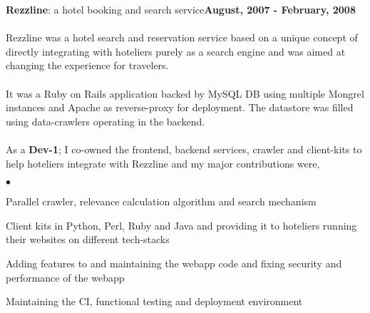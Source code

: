 \documentclass[margin,line]{res}
\newenvironment{list2}{
  \begin{list}{$\bullet$}{%
      \setlength{\itemsep}{0in}
      \setlength{\parsep}{0in} \setlength{\parskip}{0in}
      \setlength{\topsep}{0in} \setlength{\partopsep}{0in} 
      \setlength{\leftmargin}{0.2in}}}{\end{list}}
\begin{document}
\begin{resume}
{\bf Rezzline}: a hotel booking and search service\hfill {\bf August, 2007 - February, 2008}\\
\\
Rezzline was a hotel search and reservation service based on a unique concept of directly integrating with hoteliers purely as a search engine and was aimed at changing the experience for travelers.\\
\\
It was a Ruby on Rails application backed by MySQL DB using multiple Mongrel instances and Apache as reverse-proxy for deployment. The datastore was filled using data-crawlers operating in the backend.\\
\\
As a {\bf Dev-1}; I co-owned the frontend, backend services, crawler and client-kits to help hoteliers integrate with Rezzline and my major contributions were,\\
\begin{list2}
\item Parallel crawler, relevance calculation algorithm and search mechanism
\item Client kits in Python, Perl, Ruby and Java and providing it to hoteliers running their websites on different tech-stacks
\item Adding features to and maintaining the webapp code and fixing security and performance of the webapp
\item Maintaining the CI, functional testing  and deployment environment
\end{list2}


\end{resume}
\end{document}
